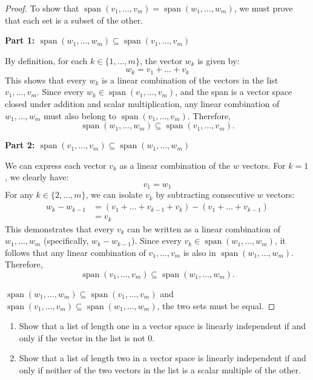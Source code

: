 \begin{proof}
	To show that $\operatorname{span}(v_1, \dots, v_m) = \operatorname{span}(w_1, \dots, w_m)$, we must prove that each set is a subset of the other.
	
	\textbf{Part 1: $\operatorname{span}(w_1, \dots, w_m) \subseteq \operatorname{span}(v_1, \dots, v_m)$}
	
	By definition, for each $k \in \{1, \dots, m\}$, the vector $w_k$ is given by:
	\[
	w_k = v_1 + \dots + v_k
	\]
	This shows that every $w_k$ is a linear combination of the vectors in the list $v_1, \dots, v_m$. Since every $w_k \in \operatorname{span}(v_1, \dots, v_m)$, and the span is a vector space closed under addition and scalar multiplication, any linear combination of $w_1, \dots, w_m$ must also belong to $\operatorname{span}(v_1, \dots, v_m)$. Therefore, 
	\[
	\operatorname{span}(w_1, \dots, w_m) \subseteq \operatorname{span}(v_1, \dots, v_m).
	\]
	
	\textbf{Part 2: $\operatorname{span}(v_1, \dots, v_m) \subseteq \operatorname{span}(w_1, \dots, w_m)$}
	
	We can express each vector $v_k$ as a linear combination of the $w$ vectors. For $k = 1$, we clearly have:
	\[
	v_1 = w_1
	\]
	For any $k \in \{2, \dots, m\}$, we can isolate $v_k$ by subtracting consecutive $w$ vectors:
	\begin{align*}
		w_k - w_{k-1} &= (v_1 + \dots + v_{k-1} + v_k) - (v_1 + \dots + v_{k-1}) \\
		&= v_k
	\end{align*}
	This demonstrates that every $v_k$ can be written as a linear combination of $w_1, \dots, w_m$ (specifically, $w_k - w_{k-1}$). Since every $v_k \in \operatorname{span}(w_1, \dots, w_m)$, it follows that any linear combination of $v_1, \dots, v_m$ is also in $\operatorname{span}(w_1, \dots, w_m)$. Therefore,
	\[
	\operatorname{span}(v_1, \dots, v_m) \subseteq \operatorname{span}(w_1, \dots, w_m).
	\]
	
	 $\operatorname{span}(w_1, \dots, w_m) \subseteq \operatorname{span}(v_1, \dots, v_m)$ and $\operatorname{span}(v_1, \dots, v_m) \subseteq \operatorname{span}(w_1, \dots, w_m)$, the two sets must be equal.
\end{proof}
\begin{question} \mbox{}
	\begin{enumerate}
	\item[(a)] Show that a list of length one in a vector space is linearly independent if and only if the vector in the list is not $0$.
	\item[(b)] Show that a list of length two in a vector space is linearly independent if and only if neither of the two vectors in the list is a scalar multiple of the other.
	\end{enumerate}
\end{question}
